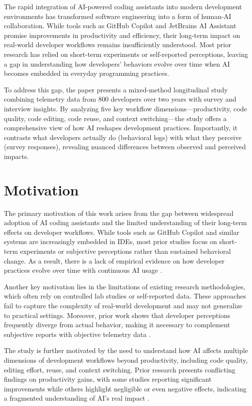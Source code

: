 The rapid integration of AI-powered coding assistants into modern development environments has transformed software engineering into a form of human-AI collaboration. While tools such as GitHub Copilot and JetBrains AI Assistant promise improvements in productivity and efficiency, their long-term impact on real-world developer workflows remains insufficiently understood. Most prior research has relied on short-term experiments or self-reported perceptions, leaving a gap in understanding how developers' behaviors evolve over time when AI becomes embedded in everyday programming practices.

To address this gap, the paper presents a mixed-method longitudinal study combining telemetry data from 800 developers over two years with survey and interview insights. By analyzing five key workflow dimensions—productivity, code quality, code editing, code reuse, and context switching—the study offers a comprehensive view of how AI reshapes development practices. Importantly, it contrasts what developers actually do (behavioral logs) with what they perceive (survey responses), revealing nuanced differences between observed and perceived impacts.

\section{Motivation}
The primary motivation of this work arises from the gap between widespread adoption of AI coding assistants and the limited understanding of their long-term effects on developer workflows. While tools such as GitHub Copilot and similar systems are increasingly embedded in IDEs, most prior studies focus on short-term experiments or subjective perceptions rather than sustained behavioral change. As a result, there is a lack of empirical evidence on how developer practices evolve over time with continuous AI usage \cite{imai2022copilot,vaithilingam2022expectation,liang2024survey}.

Another key motivation lies in the limitations of existing research methodologies, which often rely on controlled lab studies or self-reported data. These approaches fail to capture the complexity of real-world development and may not generalize to practical settings. Moreover, prior work shows that developer perceptions frequently diverge from actual behavior, making it necessary to complement subjective reports with objective telemetry data \cite{devanbu2016belief}.

The study is further motivated by the need to understand how AI affects multiple dimensions of development workflows beyond productivity, including code quality, editing effort, reuse, and context switching. Prior research presents conflicting findings on productivity gains, with some studies reporting significant improvements while others highlight negligible or even negative effects, indicating a fragmented understanding of AI's real impact \cite{peng2023copilot,ziegler2022productivity,becker2025impact}.

